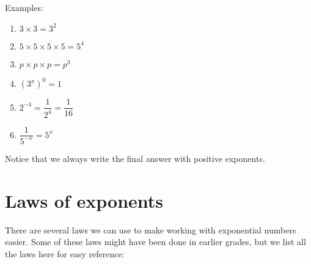 Examples:
\begin{enumerate}[itemsep=5pt, label=\textbf{\arabic*.}]
\item $3 \times 3 = 3^2$
\item $5 \times 5 \times 5 \times 5 = 5^4 $
\item $p \times p \times p = p^3$
\item $(3^x)^0 = 1$
\item $ 2^{-4} = \dfrac{1}{2^4} = \dfrac{1}{16}$
\item $ \dfrac{1}{5^{-x}} = 5^x$
\end{enumerate}

Notice that we always write the final answer with positive exponents.
\par
{}







\section {Laws of exponents}
There are several laws we can use to make working with exponential numbers easier. 
Some of these laws might have been done in earlier grades, but we list all the laws here for easy reference: 

